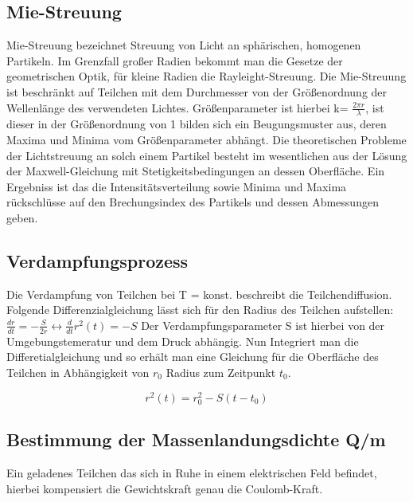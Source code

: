 \documentclass[10pt,a4paper]{article}
\begin{document}
\subsection{Mie-Streuung}

Mie-Streuung bezeichnet Streuung von Licht an  sphärischen, homogenen Partikeln. Im Grenzfall großer Radien bekommt man die Gesetze der geometrischen Optik, für kleine Radien die Rayleight-Streuung. Die Mie-Streuung ist beschränkt auf Teilchen mit dem Durchmesser von der Größenordnung der Wellenlänge des verwendeten Lichtes.
Größenparameter ist hierbei k= $\frac {2\pi r}{\lambda}$, ist dieser in der Größenordnung von 1 bilden sich ein Beugungsmuster aus, deren Maxima und Minima vom Größenparameter abhängt.
Die theoretischen Probleme der Lichtstreuung an solch einem Partikel besteht im wesentlichen aus der Lösung der Maxwell-Gleichung mit Stetigkeitsbedingungen an dessen Oberfläche. Ein Ergebniss ist das die Intensitätsverteilung sowie Minima und Maxima rückschlüsse auf den Brechungsindex des Partikels und dessen Abmessungen geben.

\subsection{Verdampfungsprozess}

Die Verdampfung von Teilchen bei T = konst. beschreibt die Teilchendiffusion. Folgende Differenzialgleichung lässt sich für den Radius des Teilchen aufstellen:\\

$\frac{dr}{dt}= -\frac {S}{2r} \leftrightarrow \frac {d}{dt}r^2(t)=-S$
Der Verdampfungsparameter S ist hierbei von der Umgebungstemeratur und dem Druck abhängig. Nun Integriert man die Differetialgleichung und so erhält man eine Gleichung für die Oberfläche des Teilchen in Abhängigkeit von $r_0$ Radius zum Zeitpunkt $t_0$. 

\begin{equation}
r^2(t)= r_0^2-S(t-t_0)
\label {6}
\end{equation}





\subsection{Bestimmung der Massenlandungsdichte Q/m}

Ein geladenes Teilchen das sich in Ruhe in einem elektrischen Feld befindet, hierbei kompensiert die Gewichtskraft genau die Coulomb-Kraft.\\
\end{document}

